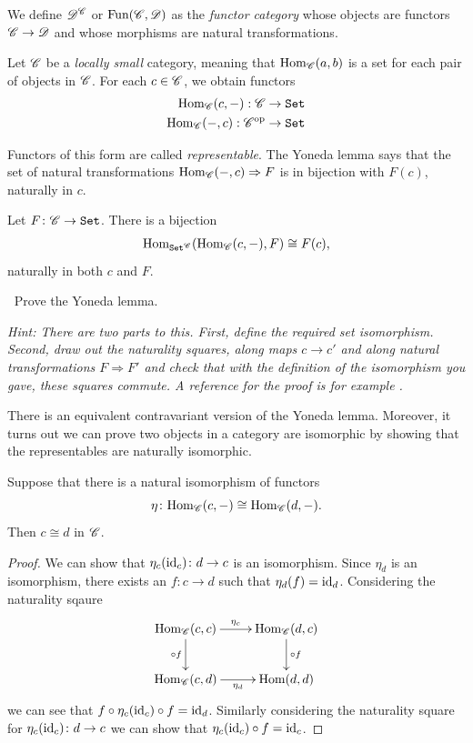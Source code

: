 \documentclass{article}[11pt]
\begin{document}
\begin{definition} We define $\mathscr{D}^{\mathscr{C}}$ or $\text{Fun}(\mathscr{C},\mathscr{D})$ as the \textit{functor category} whose objects are functors $\mathscr{C}\to \mathscr{D}$ and whose morphisms are natural transformations.
\end{definition}

Let $\mathscr{C}$ be a \textit{locally small} category, meaning that $\textup{Hom}_{\mathscr{C}}(a,b)$ is a set for each pair of objects in $\mathscr{C}$. For each $c\in \mathscr{C}$, we obtain functors
\begin{align*}
	\textup{Hom}_{\mathscr{C}} (c,-) : \mathscr{C} &\to \texttt{Set} \\
	\textup{Hom}_{\mathscr{C}}(-,c) : \mathscr{C}^{\text{op}} &\to \texttt{Set}
\end{align*}

Functors of this form are called \emph{representable}. The Yoneda lemma says that the set of natural transformations
$\textup{Hom}_{\mathscr{C}}(-,c)\Rightarrow F$ is in bijection with $F(c)$, naturally
in $c$.
\begin{lemma} Let $F\colon \mathscr{C} \to \texttt{Set}$. There is a bijection
\begin{align*}
	\textup{Hom}_{\texttt{Set}^{\mathscr{C}}}(\textup{Hom}_{\mathscr{C}} (c,-), F) \cong F(c),
\end{align*}
naturally in both $c$ and $F$.
\end{lemma}

\begin{exercise} $\ $
Prove the Yoneda lemma.

\emph{Hint: There are two parts to this. First, define the required set isomorphism. Second, draw out the naturality squares, along maps $c\to c'$ and along natural transformations $F\Rightarrow F'$ and check that with the definition  of the isomorphism you gave, these squares commute.  A reference for the proof is for example \cite[Lemma 2.5]{mehrle}.}
\end{exercise}
There is an equivalent contravariant version of the Yoneda lemma. Moreover, it turns out we can prove two objects in a category are isomorphic by showing that the representables are naturally isomorphic.

\begin{lemma}
Suppose that there is a natural isomorphism of functors $$\eta\colon \textup{Hom}_{\mathscr{C}}(c, -)\cong \textup{Hom}_{\mathscr{C}}(d, -).$$ Then $c\cong d$ in $\mathscr{C}$.
\end{lemma}

\begin{proof}
We can show that $\eta_c(\text{id}_c)\colon d\to c$ is an isomorphism. Since $\eta_d$ is an isomorphism, there exists an $f\colon c\to d$ such that $\eta_d(f)=\text{id}_d$. Considering the naturality sqaure
\[\xymatrix{
\Hom_\C(c,c)\ar[r]^-{\eta_c}\ar[d]_-{\circ f}  & \Hom_\C(d,c) \ar[d]^-{\circ f} \\
\Hom_\C(c,d) \ar[r]_-{\eta_d}& \Hom(d,d)
}\]  we can see that $f\circ \eta_c(\text{id}_c)\circ f=\text{id}_d$. Similarly considering the naturality square for $\eta_c(\text{id}_c)\colon d\to c$ we can show that $\eta_c(\text{id}_c)\circ f=\text{id}_c$.
\end{proof}
\end{document}
